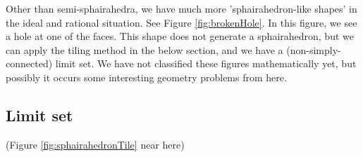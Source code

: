 \documentclass[suppldata, dvipdfmx]{interact}
\theoremstyle{plain}%
\theoremstyle{definition}
\theoremstyle{remark}
\theoremstyle{problemstyle}
\begin{document}
Other than semi-sphairahedra, we have much more 'sphairahedron-like
shapes' in the ideal and rational situation.  See Figure \ref{fig:brokenHole}. In this
figure, we see a hole at one of the faces.  This shape does not generate a
sphairahedron, but we can apply the tiling method in the below section, 
and we have a (non-simply-connected) limit set.  We have not classified
these figures mathematically yet, but possibly it occurs some
interesting geometry problems from here.


\subsection{Limit set}\label{constructFractal}

(Figure \ref{fig:sphairahedronTile}
 near here)
\end{document}
